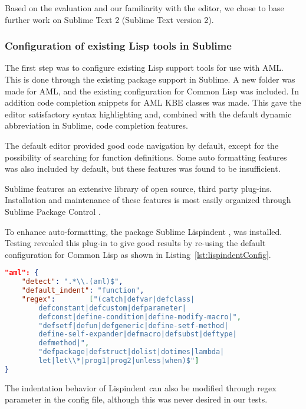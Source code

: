 Based on the evaluation and our familiarity with the editor, we chose to base further work on Sublime Text 2 (Sublime Text version 2).

\subsubsection{Configuration of existing Lisp tools in Sublime} %
\label{ssub:configuration_of_existing_lisp_tools_in_sublime}
The first step was to configure existing Lisp support tools for use with AML. This is done through the existing package support in Sublime. A new folder was made for AML, and the existing configuration for Common Lisp was included. In addition code completion snippets for AML KBE classes was made. This gave the editor satisfactory syntax highlighting and, combined with the default dynamic abbreviation in Sublime, code completion features.

The default editor provided good code navigation by default, except for the possibility of searching for function definitions. Some auto formatting features was also included by default, but these features was found to be insufficient.

Sublime features an extensive library of open source, third party plug-ins. Installation and maintenance of these features is most easily organized through Sublime Package Control \citep{bond}.

To enhance auto-formatting, the package Sublime Lispindent \citep{Friberg}, was installed. Testing revealed this plug-in to give good results by re-using the default configuration for Common Lisp as shown in Listing~\ref{lst:lispindentConfig}.

\begin{lstlisting}[language=json, caption={Lispindent config},label={lst:lispindentConfig}]
"aml": {
    "detect": ".*\\.(aml)$",
    "default_indent": "function",
    "regex":        ["(catch|defvar|defclass|
        defconstant|defcustom|defparameter|
        defconst|define-condition|define-modify-macro|",
        "defsetf|defun|defgeneric|define-setf-method|
        define-self-expander|defmacro|defsubst|deftype|
        defmethod|",
        "defpackage|defstruct|dolist|dotimes|lambda|
        let|let\\*|prog1|prog2|unless|when)$"]
}
\end{lstlisting}

The indentation behavior of Lispindent can also be modified through regex parameter in the config file, although this was never desired in our tests.

